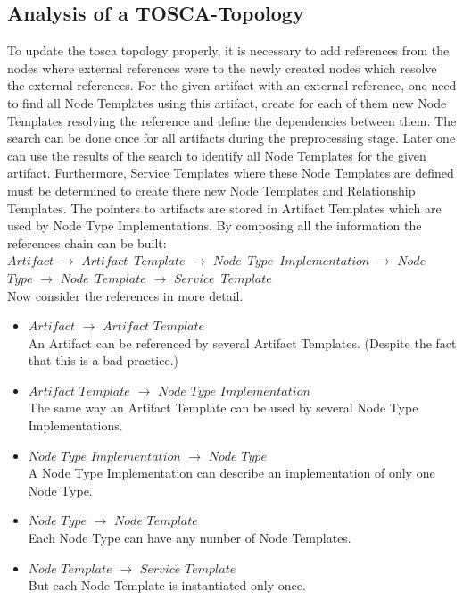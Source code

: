 \subsection{Analysis of a TOSCA-Topology}\label{subs:analyse}
To update the \gls{tosca} topology properly, it is necessary to add references from the nodes where external references were to the newly created nodes which resolve the external references. 
For the given artifact with an external reference, one need to find all Node Templates using this artifact, create for each of them new Node Templates resolving the reference and define the dependencies between them.
The search can be done once for all artifacts during the preprocessing stage.
Later one can use the results of the search to identify all Node Templates for the given artifact.
Furthermore, Service Templates where these Node Templates are defined must be determined to create there new Node Templates and Relationship Templates.
The pointers to artifacts are stored in Artifact Templates which are used by Node Type Implementations.
By composing all the information the references chain can be built:\\
$Artifact$ $\rightarrow$ $Artifact$~$Template$ $\rightarrow$ $Node$~$Type$~$Implementation$ $\rightarrow$ $Node$~$Type$ $\rightarrow$ $Node$~$Template$ $\rightarrow$ $Service$~$Template$\\
Now consider the references in more detail. 
\begin{itemize}
	\item $Artifact$ $\rightarrow$ $Artifact$ $Template$\\
	An Artifact can be referenced by several Artifact Templates. (Despite the fact that this is a bad practice.)
	\item  $Artifact$ $Template$ $\rightarrow$ $Node$ $Type$ $Implementation$ \\
	The same way an Artifact Template can be used by several Node Type Implementations.
	\item $Node$ $Type$ $Implementation$ $\rightarrow$ $Node$ $Type$ \\
	A Node Type Implementation can describe an implementation of only one Node Type.
	\item  $Node$ $Type$ $\rightarrow$ $Node$ $Template$\\
	Each Node Type can have any number of Node Templates.
	\item  $Node$ $Template$ $\rightarrow$ $Service$ $Template$\\
	But each Node Template is instantiated only once.
\end{itemize}
